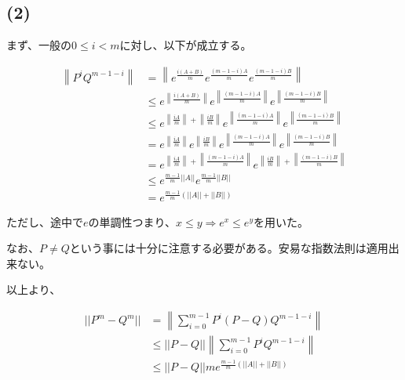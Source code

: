 \documentclass[a4paper, 10pt, dvipdfmx]{jlreq}
\begin{document}
\subsection*{(2)}

まず、一般の$0\leq i < m$に対し、以下が成立する。

\begin{align*}
  \left\lVert P^iQ^{m-1-i}\right\rVert & = \left\lVert e^{\frac{i(A+B)}{m}}e^{\frac{(m-1-i)A}{m}}e^{\frac{(m-1-i)B}{m}} \right\rVert                                                                                \\
                                       & \leq e^{\left\lVert\frac{i(A+B)}{m}\right\rVert}e^{\left\lVert\frac{(m-1-i)A}{m}\right\rVert}e^{\left\lVert\frac{(m-1-i)B}{m}\right\rVert}                                 \\
                                       & \leq e^{\left\lVert\frac{iA}{m}\right\rVert+\left\lVert\frac{iB}{m}\right\rVert}e^{\left\lVert\frac{(m-1-i)A}{m}\right\rVert}e^{\left\lVert\frac{(m-1-i)B}{m}\right\rVert} \\
                                       & = e^{\left\lVert\frac{iA}{m}\right\rVert}e^{\left\lVert\frac{iB}{m}\right\rVert}e^{\left\lVert\frac{(m-1-i)A}{m}\right\rVert}e^{\left\lVert\frac{(m-1-i)B}{m}\right\rVert} \\
                                       & = e^{\left\lVert\frac{iA}{m}\right\rVert+\left\lVert\frac{(m-1-i)A}{m}\right\rVert}e^{\left\lVert\frac{iB}{m}\right\rVert+\left\lVert\frac{(m-1-i)B}{m}\right\rVert}       \\
                                       & \leq e^{\frac{m-1}{m}||A||}e^{\frac{m-1}{m}||B||}                                                                                                                          \\
                                       & = e^{\frac{m-1}{m}(||A||+||B||)}
\end{align*}

ただし、途中で$e$の単調性つまり、$x \leq y\Rightarrow e^x \leq e^y$を用いた。

なお、$P \neq Q$という事には十分に注意する必要がある。安易な指数法則は適用出来ない。

以上より、

\begin{align*}
  ||P^m-Q^m|| & =\left\lVert \sum_{i=0}^{m-1}P^i(P-Q)Q^{m-1-i}\right\rVert        \\
              & \leq ||P-Q||\left\lVert \sum_{i=0}^{m-1}P^i Q^{m-1-i}\right\rVert \\
              & \leq ||P-Q||m e^{\frac{m-1}{m}(||A||+||B||)}
\end{align*}
\end{document}
